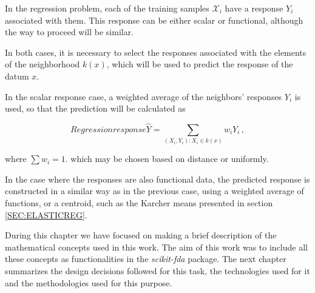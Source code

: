 In the regression problem, each of the training samples $\mathcal{X}_i$ have a
response $Y_i$ associated with them. This response can be either scalar or
functional, although the way to proceed will be similar.

In both cases, it is necessary to select the responses associated with the
elements of the neighborhood $k(x)$, which will be used to predict the response
of the datum $x$.

In the scalar response case, a weighted average of the neighbors’ responses
$Y_i$ is used, so that the prediction will be calculated as

\begin{equation}{Regression response}
\hat Y = \sum_{(X_i, Y_i) : X_i \in k(x)} w_i Y_i \, ,
\end{equation}

where $\sum w_i = 1$.
which may be chosen based on distance or uniformly.

In the case where the responses are also functional data,
the predicted response is constructed in a similar way as in the previous
case, using a weighted average of functions, or a centroid, such as the
Karcher means presented in section \ref{SEC:ELASTICREG}.

During this chapter we have focused on making a brief description of the
mathematical concepts used in this work. The aim of this work was to include
all these concepts as functionalities in the \textit{scikit-fda} package.
The next chapter summarizes the design decisions followed for
this task, the technologies used for it and the methodologies used for this purpose.
